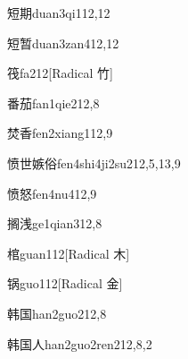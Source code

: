 \begin{verbete}{短期}{duan3qi1}{12,12}
\end{verbete}

\begin{verbete}{短暂}{duan3zan4}{12,12}
\end{verbete}

\begin{verbete}{筏}{fa2}{12}[Radical 竹]
\end{verbete}

\begin{verbete}{番茄}{fan1qie2}{12,8}
\end{verbete}

\begin{verbete}{焚香}{fen2xiang1}{12,9}
\end{verbete}

\begin{verbete}{愤世嫉俗}{fen4shi4ji2su2}{12,5,13,9}
\end{verbete}

\begin{verbete}{愤怒}{fen4nu4}{12,9}
\end{verbete}

\begin{verbete}{搁浅}{ge1qian3}{12,8}
\end{verbete}

\begin{verbete}{棺}{guan1}{12}[Radical ⽊]
\end{verbete}

\begin{verbete}{锅}{guo1}{12}[Radical 金]
\end{verbete}

\begin{verbete}{韩国}{han2guo2}{12,8}
\end{verbete}

\begin{verbete}{韩国人}{han2guo2ren2}{12,8,2}
\end{verbete}

